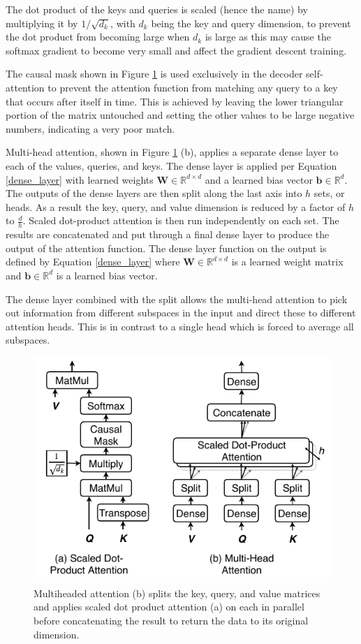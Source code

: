 \documentclass[conference]{IEEEtran}
\begin{document}
The dot product of the keys and queries is scaled (hence the name) by multiplying it by $1 / \sqrt{d_k}$, with $d_k$ being the key and query dimension, to prevent the dot product from becoming large when $d_k$ is large as this may cause the softmax gradient to become very small and affect the gradient descent training.

The causal mask shown in Figure \ref{fig:multihead} is used exclusively in the decoder self-attention to prevent the attention function from matching any query to a key that occurs after itself in time.
This is achieved by leaving the lower triangular portion of the matrix untouched and setting the other values to be large negative numbers, indicating a very poor match.

Multi-head attention, shown in Figure \ref{fig:multihead} (b), applies a separate dense layer to each of the values, queries, and keys. 
The dense layer is applied per Equation \ref{dense_layer} with learned weights $\boldsymbol{W} \in \mathbb{R}^{d \times d}$ and a learned bias vector $\boldsymbol{b} \in \mathbb{R}^{d}$.
The outputs of the dense layers are then split along the last axis into $h$ sets, or heads.
As a result the key, query, and value dimension is reduced by a factor of $h$ to $\frac{d}{h}$.
Scaled dot-product attention is then run independently on each set.
The results are concatenated and put through a final dense layer to produce the output of the attention function.
The dense layer function on the output is defined by Equation \ref{dense_layer} where $\boldsymbol{W} \in \mathbb{R}^{d \times d}$ is a learned weight matrix and $\boldsymbol{b} \in \mathbb{R}^{d}$ is a learned bias vector.

The dense layer combined with the split allows the multi-head attention to pick out information from different subspaces in the input and direct these to different attention heads.
This is in contrast to a single head which is forced to average all subspaces.

\begin{figure}[htbp]
	\centerline{\includegraphics[width=.35\textwidth]{images/multihead_attn.pdf}}
	\caption{Multiheaded attention (b) splits the key, query, and value matrices and applies scaled dot product attention (a) on each in parallel before concatenating the result to return the data to its original dimension.}
	\label{fig:multihead}
\end{figure}
\end{document}
